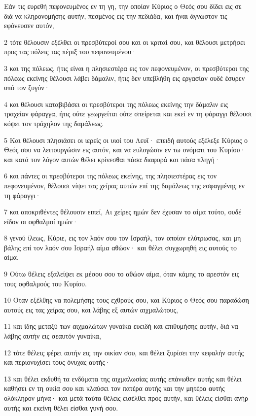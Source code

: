 \par Εάν τις ευρεθή πεφονευμένος εν τη γη, την οποίαν Κύριος ο Θεός σου δίδει εις σε διά να κληρονομήσης αυτήν, πεσμένος εις την πεδιάδα, και ήναι άγνωστον τις εφόνευσεν αυτόν,
\par 2 τότε θέλουσιν εξέλθει οι πρεσβύτεροί σου και οι κριταί σου, και θέλουσι μετρήσει προς τας πόλεις τας πέριξ του πεφονευμένου·
\par 3 και της πόλεως, ήτις είναι η πλησιεστέρα εις τον πεφονευμένον, οι πρεσβύτεροι της πόλεως εκείνης θέλουσι λάβει δάμαλιν, ήτις δεν υπεβλήθη εις εργασίαν ουδέ έσυρεν υπό τον ζυγόν·
\par 4 και θέλουσι καταβιβάσει οι πρεσβύτεροι της πόλεως εκείνης την δάμαλιν εις τραχείαν φάραγγα, ήτις ούτε γεωργείται ούτε σπείρεται και εκεί εν τη φάραγγι θέλουσι κόψει τον τράχηλον της δαμάλεως.
\par 5 Και θέλουσι πλησιάσει οι ιερείς οι υιοί του Λευΐ· επειδή αυτούς εξέλεξε Κύριος ο Θεός σου να λειτουργώσιν εις αυτόν, και να ευλογώσιν εν τω ονόματι του Κυρίου· και κατά τον λόγον αυτών θέλει κρίνεσθαι πάσα διαφορά και πάσα πληγή·
\par 6 και πάντες οι πρεσβύτεροι της πόλεως εκείνης, της πλησιεστέρας εις τον πεφονευμένον, θέλουσι νίψει τας χείρας αυτών επί της δαμάλεως της εσφαγμένης εν τη φάραγγι·
\par 7 και αποκριθέντες θέλουσιν ειπεί, Αι χείρες ημών δεν έχυσαν το αίμα τούτο, ουδέ είδον οι οφθαλμοί ημών·
\par 8 γενού ίλεως, Κύριε, εις τον λαόν σου τον Ισραήλ, τον οποίον ελύτρωσας, και μη βάλης επί τον λαόν σου Ισραήλ αίμα αθώον· και θέλει συγχωρηθή εις αυτούς το αίμα.
\par 9 Ούτω θέλεις εξαλείψει εκ μέσου σου το αθώον αίμα, όταν κάμης το αρεστόν εις τους οφθαλμούς του Κυρίου.
\par 10 Όταν εξέλθης να πολεμήσης τους εχθρούς σου, και Κύριος ο Θεός σου παραδώση αυτούς εις τας χείρας σου, και λάβης εξ αυτών αιχμαλώτους,
\par 11 και ίδης μεταξύ των αιχμαλώτων γυναίκα ευειδή και επιθυμήσης αυτήν, διά να λάβης αυτήν εις σεαυτόν γυναίκα,
\par 12 τότε θέλεις φέρει αυτήν εις την οικίαν σου, και θέλει ξυρίσει την κεφαλήν αυτής και περιονυχίσει τους όνυχας αυτής·
\par 13 και θέλει εκδυθή τα ενδύματα της αιχμαλωσίας αυτής επάνωθεν αυτής και θέλει καθήσει εν τη οικία σου και κλαύσει τον πατέρα αυτής και την μητέρα αυτής ολόκληρον μήνα· και μετά ταύτα θέλεις εισέλθει προς αυτήν, και θέλεις είσθαι ανήρ αυτής και εκείνη θέλει είσθαι γυνή σου.
